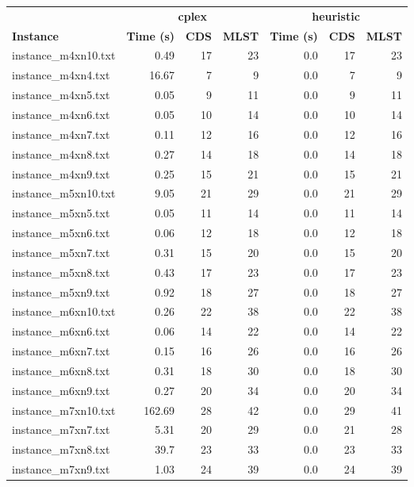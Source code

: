\documentclass{article}
\begin{document}
\begin{center}
\renewcommand{\arraystretch}{1.4}
 \begin{tabular}{lrrrrrr}
	\hline
 & \multicolumn{3}{c}{\textbf{cplex}} & \multicolumn{3}{c}{\textbf{heuristic}}\\
\textbf{Instance}  & \textbf{Time (s)} & \textbf{CDS} & \textbf{MLST}   & \textbf{Time (s)} & \textbf{CDS} & \textbf{MLST}  \\\hline

instance\_m4xn10.txt & 0.49 & 17 & 23
 & 0.0 & 17 & 23
\\
instance\_m4xn4.txt & 16.67 & 7 & 9
 & 0.0 & 7 & 9
\\
instance\_m4xn5.txt & 0.05 & 9 & 11
 & 0.0 & 9 & 11
\\
instance\_m4xn6.txt & 0.05 & 10 & 14
 & 0.0 & 10 & 14
\\
instance\_m4xn7.txt & 0.11 & 12 & 16
 & 0.0 & 12 & 16
\\
instance\_m4xn8.txt & 0.27 & 14 & 18
 & 0.0 & 14 & 18
\\
instance\_m4xn9.txt & 0.25 & 15 & 21
 & 0.0 & 15 & 21
\\
instance\_m5xn10.txt & 9.05 & 21 & 29
 & 0.0 & 21 & 29
\\
instance\_m5xn5.txt & 0.05 & 11 & 14
 & 0.0 & 11 & 14
\\
instance\_m5xn6.txt & 0.06 & 12 & 18
 & 0.0 & 12 & 18
\\
instance\_m5xn7.txt & 0.31 & 15 & 20
 & 0.0 & 15 & 20
\\
instance\_m5xn8.txt & 0.43 & 17 & 23
 & 0.0 & 17 & 23
\\
instance\_m5xn9.txt & 0.92 & 18 & 27
 & 0.0 & 18 & 27
\\
instance\_m6xn10.txt & 0.26 & 22 & 38
 & 0.0 & 22 & 38
\\
instance\_m6xn6.txt & 0.06 & 14 & 22
 & 0.0 & 14 & 22
\\
instance\_m6xn7.txt & 0.15 & 16 & 26
 & 0.0 & 16 & 26
\\
instance\_m6xn8.txt & 0.31 & 18 & 30
 & 0.0 & 18 & 30
\\
instance\_m6xn9.txt & 0.27 & 20 & 34
 & 0.0 & 20 & 34
\\
instance\_m7xn10.txt & 162.69 & 28 & 42
 & 0.0 & 29 & 41
\\
instance\_m7xn7.txt & 5.31 & 20 & 29
 & 0.0 & 21 & 28
\\
instance\_m7xn8.txt & 39.7 & 23 & 33
 & 0.0 & 23 & 33
\\
instance\_m7xn9.txt & 1.03 & 24 & 39
 & 0.0 & 24 & 39
\\

\end{tabular}
\end{center}
\end{document}
